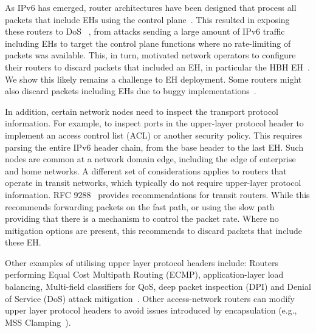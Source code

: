 \documentclass[conference]{IEEEtran}
\begin{document}
As IPv6 has emerged, router architectures have been designed that process all packets that include EHs using the control plane~\cite{ietf-v6ops-hbh-03}.  This resulted in exposing these routers to DoS ~\cite{naagas2021deh}, from attacks sending a large amount of IPv6 traffic including EHs to target the control plane functions where no rate-limiting of packets was available. This, in turn, motivated
network operators to configure their routers to discard packets that included an EH,
in particular the HBH EH~\cite{ietf-v6ops-hbh-03}. We show this likely remains a challenge to EH deployment.
Some routers might also discard packets including EHs due to buggy implementations~\cite{fernando-talk}.

In addition, certain network nodes need to inspect the transport protocol information. For example, to inspect ports in the upper-layer protocol header to implement an access control list (ACL) or another security policy.
This requires parsing the entire IPv6 header chain, from the base header to the last EH. 
Such nodes are common at a network domain edge, including the edge of enterprise and home networks.
A different set of considerations applies to routers that operate in transit networks, which typically do not require upper-layer protocol information.
RFC 9288~\cite{rfc9288}  provides recommendations for transit routers. While this recommends forwarding packets on the fast path, or using the slow path providing that there is a mechanism to control the  packet rate. Where no mitigation options are present, this recommends to discard packets that include these EH. 

Other examples of utilising upper layer protocol headers include: Routers performing Equal Cost Multipath Routing (ECMP), application-layer load balancing, Multi-field classifiers for QoS, deep packet inspection (DPI) and Denial of Service (DoS) attack mitigation~\cite{lb-classification}. Other access-network routers can modify upper layer protocol headers to avoid issues introduced by encapsulation (e.g., MSS Clamping~\cite{custura-mtu}).




\end{document}
